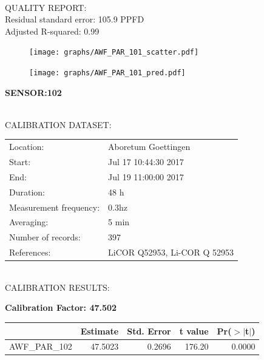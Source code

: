 \documentclass[oneside]{report}
\begin{document}
\hrulefill\\
QUALITY REPORT:\\
Residual standard error: 105.9 PPFD\\
Adjusted R-squared: 0.99



\begin{figure}[H]
  \centering
  \texttt{[image: graphs/AWF\_PAR\_101\_scatter.pdf]}
\end{figure}




\begin{figure}[H]
  \centering
  \texttt{[image: graphs/AWF\_PAR\_101\_pred.pdf]}
\end{figure}

\pagebreak


\begin{center}
\large{\textbf{SENSOR:102}}\\
\end{center}

\hrulefill\\
CALIBRATION DATASET:\\
\begin{table}[h!]
  \centering
  \label{tab:table1}
  \begin{tabular}{ll}
    Location: & Aboretum Goettingen\\ 
    
    
    Start:  & Jul 17 10:44:30 2017 \\
    End:   & Jul 19 11:00:00 2017\\ 
    Duration: & 48 h\\
    Measurement frequency: & 0.3hz\\
    Averaging:  &5 min\\
    Number of records: & 397 \\
    References: & LiCOR Q52953, Li-COR Q 52953 \\
  \end{tabular}
\end{table}

\hrulefill\\
CALIBRATION RESULTS:\\


\begin{center}
\textbf{\large{Calibration Factor: 47.502}}\\
\end{center}
\begin{table}[ht]
\centering
\begin{tabular}{rrrrr}
  \hline
 & Estimate & Std. Error & t value & Pr($>$$|$t$|$) \\ 
  \hline
AWF\_PAR\_102 & 47.5023 & 0.2696 & 176.20 & 0.0000 \\ 
   \hline
\end{tabular}
\end{table}
\end{document}
